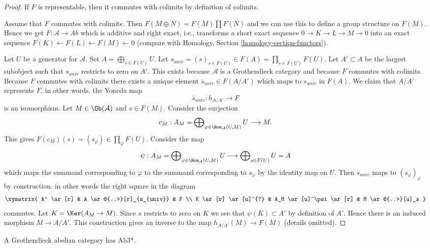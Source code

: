 \begin{proof}
If $F$ is representable, then it commutes with colimits by definition
of colimits.

\medskip\noindent
Assume that $F$ commutes with colimits. Then $F(M \oplus N) = F(M) \prod F(N)$
and we can use this to define a group structure on $F(M)$. Hence we get
$F : \mathcal{A} \to \textit{Ab}$ which is additive and right exact, i.e.,
transforms a short exact sequence $0 \to K \to L \to M \to 0$ into an exact
sequence $F(K) \leftarrow F(L) \leftarrow F(M) \leftarrow 0$ (compare with
Homology, Section \ref{homology-section-functors}).

\medskip\noindent
Let $U$ be a generator for $\mathcal{A}$. Set $A = \bigoplus_{s \in F(U)} U$.
Let $s_{univ} = (s)_{s \in F(U)} \in F(A) = \prod_{s \in F(U)} F(U)$. Let
$A' \subset A$ be the largest subobject such that $s_{univ}$ restricts to
zero on $A'$. This exists because $\mathcal{A}$ is a Grothendieck category
and because $F$ commutes with colimits. Because $F$ commutes with colimits
there exists a unique element $\overline{s}_{univ} \in F(A/A')$ which
maps to $s_{univ}$ in $F(A)$. We claim that $A/A'$ represents $F$, in
other words, the Yoneda map
$$
\overline{s}_{univ} : h_{A/A'} \longrightarrow F
$$
is an isomorphism. Let $M \in \Ob(\mathcal{A})$ and $s \in F(M)$. Consider
the surjection
$$
c_M :
A_M = \bigoplus\nolimits_{\varphi \in \Hom_\mathcal{A}(U, M)} U
\longrightarrow
M.
$$
This gives $F(c_M)(s) = (s_\varphi) \in \prod_\varphi F(U)$.
Consider the map
$$
\psi :
A_M = \bigoplus\nolimits_{\varphi \in \Hom_\mathcal{A}(U, M)} U
\longrightarrow
\bigoplus\nolimits_{s \in F(U)} U = A
$$
which maps the summand corresponding to $\varphi$ to the summand
corresponding to $s_\varphi$ by the identity map on $U$. Then $s_{univ}$
maps to $(s_\varphi)_\varphi$ by construction.
in other words the right square in the diagram
$$
\xymatrix{
A' \ar[r] &
A \ar@{..>}[r]_{s_{univ}} & F \\
K \ar[r] \ar[u]^{?} & A_M \ar[u]^\psi \ar[r] &
M \ar@{..>}[u]_s
}
$$
commutes. Let $K = \Ker(A_M \to M)$. Since $s$ restricts to zero
on $K$ we see that $\psi(K) \subset A'$ by definition of $A'$. Hence there
is an induced morphism $M \to A/A'$. This construction gives an inverse
to the map $h_{A/A'}(M) \to F(M)$ (details omitted).
\end{proof}

\begin{lemma}
\label{lemma-grothendieck-products}
A Grothendieck abelian category has Ab3*.
\end{lemma}


